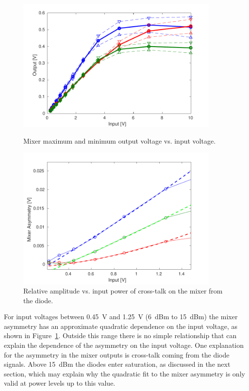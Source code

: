 \begin{figure}
  \centering
  \includegraphics[width=0.9\textwidth]{Figures/phaseMons/MixerVsVolts}
  \caption{Mixer maximum and minimum output voltage vs. input voltage.}
  \label{f:MixerVsVolts}
  \includegraphics[width=0.9\textwidth]{Figures/phaseMons/MixerAsymmetryVsVolts}
  \caption{Relative amplitude vs. input power of cross-talk on the mixer from the diode.}
  \label{f:MixerAsymmetryVsVolts}
\end{figure}

For input voltages between 0.45~V and 1.25~V (6~dBm to 15~dBm) the mixer asymmetry has an approximate quadratic dependence on the input voltage, as shown in Figure~\ref{f:MixerAsymmetryVsVolts}. Outside this range there is no simple relationship that can explain the dependence of the asymmetry on the input voltage. One explanation for the asymmetry in the mixer outputs is cross-talk coming from the diode signals. Above 15~dBm the diodes enter saturation, as discussed in the next section, which may explain why the quadratic fit to the mixer asymmetry is only valid at power levels up to this value. 

